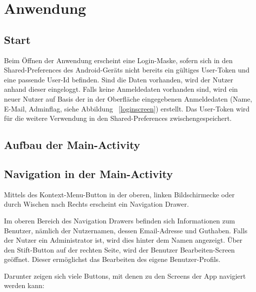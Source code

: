 \section{Anwendung}\label{sec:features}

\subsection{Start}\label{subsec:start}

Beim Öffnen der Anwendung erscheint eine Login-Maske, sofern sich in den Shared-Preferences des Android-Geräts nicht bereits ein gültiges User-Token und eine passende User-Id befinden.
Sind die Daten vorhanden, wird der Nutzer anhand dieser eingeloggt.
Falls keine Anmeldedaten vorhanden sind, wird ein neuer Nutzer auf Basis der in der Oberfläche eingegebenen Anmeldedaten (Name, E-Mail, Adminflag, siehe Abbildung ~\ref{loginscreen}) erstellt.
Das User-Token wird für die weitere Verwendung in den Shared-Preferences zwischengespeichert.


\subsection{Aufbau der Main-Activity} \label{subsec:main-activity}


\subsection{Navigation in der Main-Activity} \label{subsec:navigation}

Mittels des Kontext-Menu-Button in der oberen, linken Bildschirmecke oder durch Wischen nach Rechts erscheint ein Navigation Drawer.

Im oberen Bereich des Navigation Drawers befinden sich Informationen zum Benutzer, nämlich der Nutzernamen, dessen Email-Adresse und Guthaben.
Falls der Nutzer ein Administrator ist, wird dies hinter dem Namen angezeigt.
Über den Stift-Button auf der rechten Seite, wird der Benutzer Bearbeiten-Screen geöffnet.
Dieser ermöglichst das Bearbeiten des eigene Benutzer-Profils.

Darunter zeigen sich viele Buttons, mit denen zu den Screens der App navigiert werden kann:

